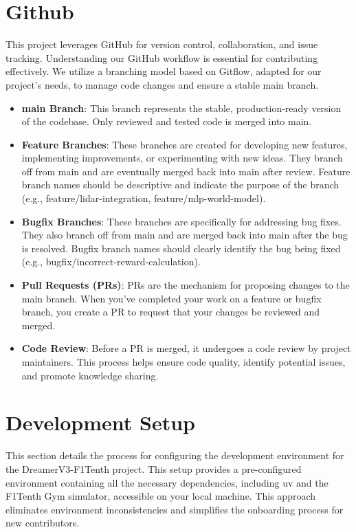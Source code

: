 \section{Github}
This project leverages GitHub for version control, collaboration, and issue tracking.  Understanding our GitHub workflow is essential for contributing effectively.  We utilize a branching model based on Gitflow, adapted for our project's needs, to manage code changes and ensure a stable main branch.
\begin{itemize}
    \item \textbf{main Branch}: This branch represents the stable, production-ready version of the codebase.  Only reviewed and tested code is merged into main.

    \item \textbf{Feature Branches}:  These branches are created for developing new features, implementing improvements, or experimenting with new ideas.  They branch off from main and are eventually merged back into main after review.  Feature branch names should be descriptive and indicate the purpose of the branch (e.g., feature/lidar-integration, feature/mlp-world-model).

    \item \textbf{Bugfix Branches}: These branches are specifically for addressing bug fixes.  They also branch off from main and are merged back into main after the bug is resolved.  Bugfix branch names should clearly identify the bug being fixed (e.g., bugfix/incorrect-reward-calculation).

    \item \textbf{Pull Requests (PRs)}:  PRs are the mechanism for proposing changes to the main branch.  When you've completed your work on a feature or bugfix branch, you create a PR to request that your changes be reviewed and merged.

    \item \textbf{Code Review}:  Before a PR is merged, it undergoes a code review by project maintainers.  This process helps ensure code quality, identify potential issues, and promote knowledge sharing.
\end{itemize}

\section{Development Setup}
This section details the process for configuring the development environment for the DreamerV3-F1Tenth project. This setup provides a pre-configured environment containing all the necessary dependencies, including uv and the F1Tenth Gym simulator, accessible on your local machine.  This approach eliminates environment inconsistencies and simplifies the onboarding process for new contributors.

